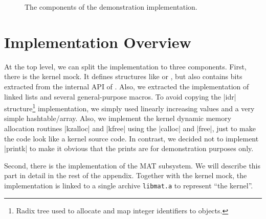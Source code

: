 \begin{figure}
	\centering
	\caption{The components of the demonstration implementation.}
	\label{fig:mat-comps}
\end{figure}

\section{Implementation Overview}

At the top level, we can split the implementation to three components. First,
there is the kernel mock. It defines structures like \skb{} or \netdev{}, but
also contains bits extracted from the internal API of . Also, we
extracted the implementation of linked lists and several general-purpose
macros. To avoid copying the \struct|idr| structure\footnote{Radix tree used to
allocate and map integer identifiers to objects.} implementation, we simply
used linearly increasing values and a very simple hashtable/array. Also, we
implement the kernel dynamic memory allocation routines \fnc|kzalloc| and
\fnc|kfree| using the  \fnc|calloc| and \fnc|free|, just to make the
code look like a kernel source code. In contrast, we decided not to implement
\fnc|printk| to make it obvious that the prints are for demonstration purposes
only.

Second, there is the implementation of the MAT subsystem. We will describe this
part in detail in the rest of the appendix. Together with the kernel mock, the
implementation is linked to a single archive \texttt{libmat.a} to represent
``the kernel''.

